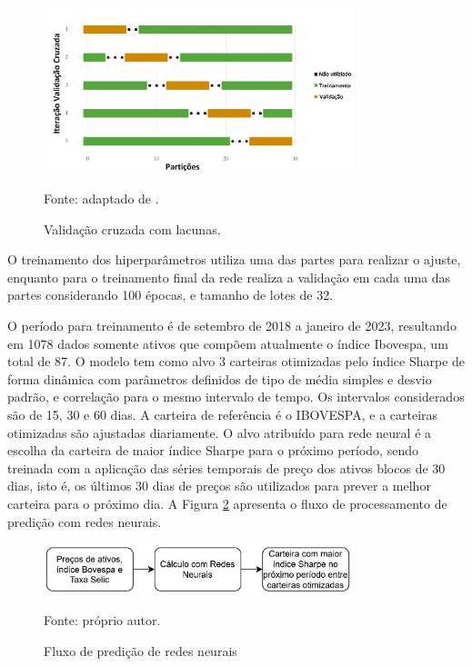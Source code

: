         \begin{figure}[H]
            \centering
            \caption{Validação cruzada com lacunas.}
            \label{fig:cross_validation}
            \includegraphics[width=0.8\textwidth]{./imagens/cross_validation.png}
            \par \footnotesize Fonte: adaptado de .
        \end{figure}

        \ipar O treinamento dos hiperparâmetros utiliza uma das partes para realizar o ajuste, enquanto para o treinamento final da rede realiza a validação em cada uma das partes considerando 100 épocas, e tamanho de lotes de 32.

        \ipar O período para treinamento é de setembro de 2018 a janeiro de 2023, resultando em 1078 dados somente ativos que compõem atualmente o índice Ibovespa, um total de 87. O modelo tem como alvo 3 carteiras otimizadas pelo índice Sharpe de forma dinâmica com parâmetros definidos de tipo de média simples e desvio padrão, e correlação para o mesmo intervalo de tempo. Os intervalos considerados são de 15, 30 e 60 dias. A carteira de referência é o \acrshort{IBOVESPA}, e a carteiras otimizadas são ajustadas diariamente. O alvo atribuído para rede neural é a escolha da carteira de maior índice Sharpe para o próximo período, sendo treinada com a aplicação das séries temporais de preço dos ativos blocos de 30 dias, isto é, os últimos 30 dias de preços são utilizados para prever a melhor carteira para o próximo dia. A Figura \ref{fig:fluxo_treinamento} apresenta o fluxo de processamento de predição com redes neurais.

        \begin{figure}[H]
            \centering
            \caption{Fluxo de predição de redes neurais}
            \label{fig:fluxo_treinamento}
            \includegraphics[width=0.8\textwidth]{imagens/fluxo_validacao.png}
            \par \footnotesize Fonte: próprio autor.
        \end{figure}

